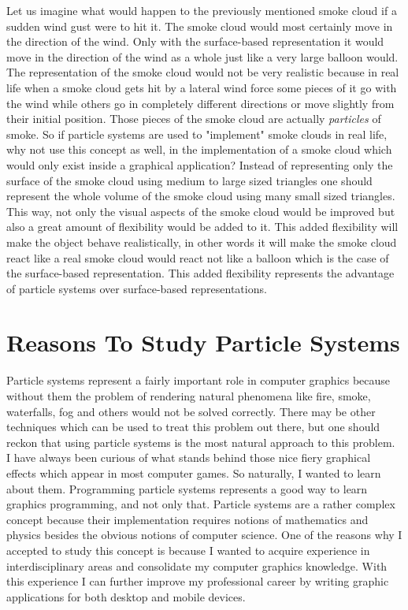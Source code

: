 Let us imagine what would happen to the previously mentioned smoke cloud if a sudden wind gust were to hit it. The smoke cloud would most certainly move in the direction of the wind. Only with the surface-based representation it would move in the direction of the wind as a whole just like a very large balloon would. The representation of the smoke cloud would not be very realistic because in real life when a smoke cloud gets hit by a lateral wind force some pieces of it go with the wind while others go in completely different directions or move slightly from their initial position. Those pieces of the smoke cloud are actually \textit{particles} of smoke. So if particle systems are used to "implement" smoke clouds in real life, why not use this concept as well, in the implementation of a smoke cloud which would only exist inside a graphical application? Instead of representing only the surface of the smoke cloud using medium to large sized triangles one should represent the whole volume of the smoke cloud using many small sized triangles. This way, not only the visual aspects of the smoke cloud would be improved but also a great amount of flexibility would be added to it. This added flexibility will make the object behave realistically, in other words it will make the smoke cloud react like a real smoke cloud would react not like a balloon which is the case of the surface-based representation. This added flexibility represents the advantage of particle systems over surface-based representations.\\
\newpage
\section{Reasons To Study Particle Systems}
Particle systems represent a fairly important role in computer graphics because without them the problem of rendering natural phenomena like fire, smoke, waterfalls, fog and others would not be solved correctly. There may be other techniques which can be used to treat this problem out there, but one should reckon that using particle systems is the most natural approach to this problem.\\

I have always been curious of what stands behind those nice fiery graphical effects which appear in most computer games. So naturally, I wanted to learn about them. Programming particle systems represents a good way to learn graphics programming, and not only that. Particle systems are a rather complex concept because their implementation requires notions of mathematics and physics besides the obvious notions of computer science. One of the reasons why I accepted to study this concept is because I wanted to acquire experience in interdisciplinary areas and consolidate my computer graphics knowledge. With this experience I can further improve my professional career by writing graphic applications for both desktop and mobile devices.\\

